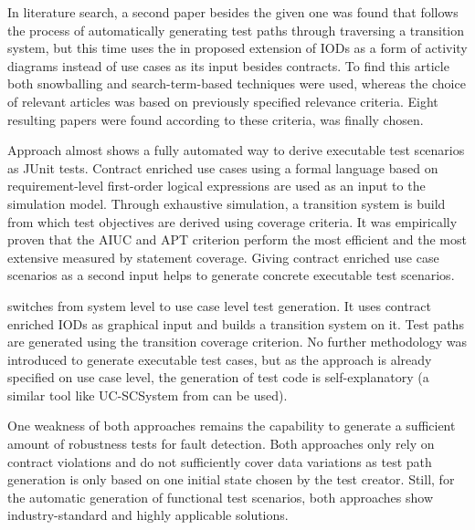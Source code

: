 \newpage

In literature search, a second paper besides the given one was found that follows the process of automatically generating test paths through traversing a transition system, but this time uses the in \cite{ClementineNebut2006} proposed extension of IODs as a form of activity diagrams instead of use cases as its input besides contracts. To find this article both snowballing and search-term-based techniques were used, whereas the choice of relevant articles was based on previously specified relevance criteria. Eight resulting papers were found according to these criteria, \cite{NajlaRaza2007} was finally chosen. 

Approach \cite{ClementineNebut2006} almost shows a fully automated way to derive executable test scenarios as JUnit tests. Contract enriched use cases using a formal language based on requirement-level first-order logical expressions are used as an input to the simulation model. Through exhaustive simulation, a transition system is build from which test objectives are derived using coverage criteria. It was empirically proven that the AIUC and APT criterion perform the most efficient and the most extensive measured by statement coverage. Giving contract enriched use case scenarios as a second input helps to generate concrete executable test scenarios. 

\cite{NajlaRaza2007} switches from system level to use case level test generation. It uses contract enriched IODs as graphical input and builds a transition system on it. Test paths are generated using the transition coverage criterion. No further methodology was introduced to generate executable test cases, but as the approach is already specified on use case level, the generation of test code is self-explanatory (a similar tool like UC-SCSystem from \cite{ClementineNebut2006} can be used).

One weakness of both approaches remains the capability to generate a sufficient amount of robustness tests for fault detection. Both approaches only rely on contract violations and do not sufficiently cover data variations as test path generation is only based on one initial state chosen by the test creator. Still, for the automatic generation of functional test scenarios, both approaches show industry-standard and highly applicable solutions.
